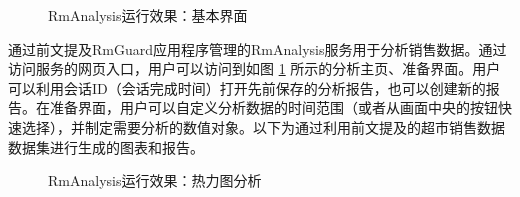 \begin{figure}[htbp]
    \centering
	\caption{RmAnalysis运行效果：基本界面}
	\label{fig:aly-core}
\end{figure}

通过前文提及RmGuard应用程序管理的RmAnalysis服务用于分析销售数据。通过访问服务的网页入口，用户可以访问到如图 \ref{fig:aly-core} 所示的分析主页、准备界面。用户可以利用会话ID（会话完成时间）打开先前保存的分析报告，也可以创建新的报告。在准备界面，用户可以自定义分析数据的时间范围（或者从画面中央的按钮快速选择），并制定需要分析的数值对象。以下为通过利用前文提及的超市销售数据数据集进行生成的图表和报告。

\begin{figure}[htbp]
    \centering
	\caption{RmAnalysis运行效果：热力图分析}
	\label{fig:aly-demo-a}
\end{figure}

